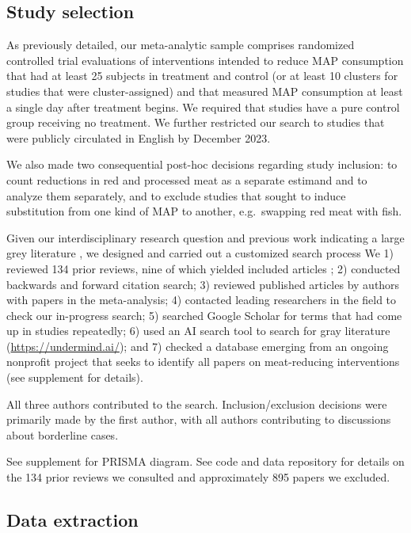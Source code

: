 \documentclass[sn-nature,referee,pdflatex]{sn-jnl}
\begin{document}
\subsection{Study selection}\label{sec3.1}

As previously detailed, our meta-analytic sample comprises randomized
controlled trial evaluations of interventions intended to reduce MAP
consumption that had at least 25 subjects in treatment and control (or
at least 10 clusters for studies that were cluster-assigned) and that
measured MAP consumption at least a single day after treatment begins.
We required that studies have a pure control group receiving no
treatment. We further restricted our search to studies that were
publicly circulated in English by December 2023.

We also made two consequential post-hoc decisions regarding study
inclusion: to count reductions in red and processed meat as a separate
estimand and to analyze them separately, and to exclude studies that
sought to induce substitution from one kind of MAP to another,
e.g.~swapping red meat with fish.

Given our interdisciplinary research question and previous work
indicating a large grey literature \citep{mathur2021meta}, we designed
and carried out a customized search process We 1) reviewed 134 prior
reviews, nine of which yielded included articles
\citep{mathur2021meta, bianchi2018conscious, bianchi2018restructuring, ammann2023, chang2023, DiGennaro2024, harguess2020, ronto2022, wynes2018};
2) conducted backwards and forward citation search; 3) reviewed
published articles by authors with papers in the meta-analysis; 4)
contacted leading researchers in the field to check our in-progress
search; 5) searched Google Scholar for terms that had come up in studies
repeatedly; 6) used an AI search tool to search for gray literature
(\url{https://undermind.ai/}); and 7) checked a database emerging from
an ongoing nonprofit project that seeks to identify all papers on
meat-reducing interventions (see supplement for details).

All three authors contributed to the search. Inclusion/exclusion
decisions were primarily made by the first author, with all authors
contributing to discussions about borderline cases.

See supplement for PRISMA diagram. See code and data repository for
details on the 134 prior reviews we consulted and approximately 895
papers we excluded.

\subsection{Data extraction}\label{sec3.3}
\end{document}
